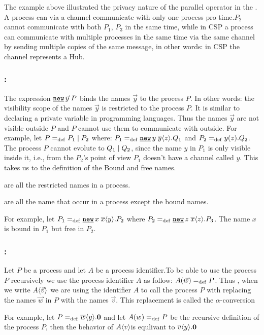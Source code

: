 The example above illustrated the privacy nature of the parallel operator in the \picalc{}. A process can via a channel communicate with only one process pro time.$P_2$ cannot communicate with both $P_1$, $P_3$ in the same time, while in \gls{CSP} a process can communicate with multiple processes in the same time via the same channel by sending multiple copies of the same message, in other words: in CSP the channel represents a Hub.


\subsubsection{:}

The expression $\procres{\vec{y}}{P}$ binds the names $\vec{y}$ to the process $P$. In other words: the visibility scope of the  names $\vec{y}$ is restricted to the process $P$. It is similar to declaring a private variable in programming languages. Thus the names $\vec{y}$ are not visible outside $P$ and $P$ cannot use them to communicate with outside. For example, let $P=_{\mathrm{def}}P_1 \mid P_2$ where: $P_1\define\procres{y}{\out{y}{z}.Q_1}$ and $P_2=_{\mathrm{def}}y(z).Q_2$. The process $P$ cannot evolute to $Q_1 \mid Q_2$, since the name $y$ in $P_1$ is only visible inside it, i.e., from the $P_2$'s point of view $P_1$ doesn't have a channel called $y$. This takes us to the definition of the Bound and free names.

\begin{definition}
\label{def_bound_names}
 are all the restricted names in a process.
\end{definition}
\begin{definition}
\label{def_free_names}
 are all the name that occur in a process except the bound names.
\end{definition}

For example, let $P_1\define\procres{x}{\out{x}{y}.P_2}$ where $P_2\define\procres{z}{\out{x}{z}.P_3}$. The name $x$ is bound in $P_1$ but free in $P_2$.


\subsubsection{:}
\label{subsubsection_process_call}

Let $P$ be a process and let $A$ be a process identifier.To be able to use the process $P$ recursively we use the process identifier $A$ as follow: $A(\vec{w})=_{\mathrm{def}}{}P$. Thus , when we write $A\langle\vec{v}\rangle$ we are using the identifier $A$ to call the process $P$ with replacing the names $\vec{w}$ in $P$ with the names $\vec{v}$. This replacement is called the $\alpha$-conversion

For example, let $P=_{\mathrm{def}}\overline{w}\langle y\rangle.\mathbf{0}$ and let $A(w)=_{\mathrm{def}}{}P$ be the recursive definition of the process $P$, then the behavior of $A\langle v\rangle$is equlivant to $\overline{v}\langle y\rangle.\mathbf{0}$ 

